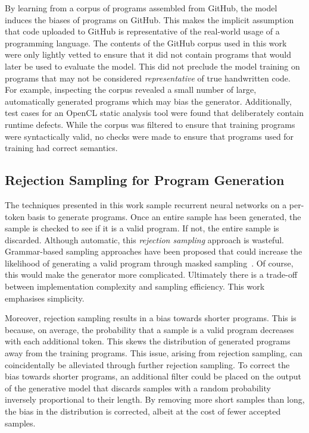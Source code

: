 By learning from a corpus of programs assembled from GitHub, the model induces the biases of programs on GitHub. This makes the implicit assumption that code uploaded to GitHub is representative of the real-world usage of a programming language. The contents of the GitHub corpus used in this work were only lightly vetted to ensure that it did not contain programs that would later be used to evaluate the model. This did not preclude the model training on programs that may not be considered \emph{representative} of true handwritten code. For example, inspecting the corpus revealed a small number of large, automatically generated programs which may bias the generator. Additionally, test cases for an OpenCL static analysis tool were found that deliberately contain runtime defects. While the corpus was filtered to ensure that training programs were syntactically valid, no checks were made to ensure that programs used for training had correct semantics.


\subsection{Rejection Sampling for Program Generation}

The techniques presented in this work sample recurrent neural networks on a per-token basis to generate programs. Once an entire sample has been generated, the sample is checked to see if it is a valid program. If not, the entire sample is discarded. Although automatic, this \emph{rejection sampling} approach is wasteful. Grammar-based sampling approaches have been proposed that could increase the likelihood of generating a valid program through masked sampling~\cite{Dyer2016}. Of course, this would make the generator more complicated. Ultimately there is a trade-off between implementation complexity and sampling efficiency. This work emphasises simplicity.

Moreover, rejection sampling results in a bias towards shorter programs. This is because, on average, the probability that a sample is a valid program decreases with each additional token. This skews the distribution of generated programs away from the training programs. This issue, arising from rejection sampling, can coincidentally be alleviated through further rejection sampling. To correct the bias towards shorter programs, an additional filter could be placed on the output of the generative model that discards samples with a random probability inversely proportional to their length. By removing more short samples than long, the bias in the distribution is corrected, albeit at the cost of fewer accepted samples.


